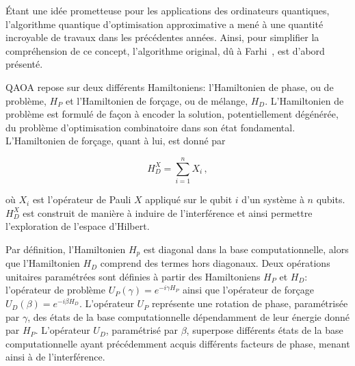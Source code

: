 Étant une idée prometteuse pour les applications des ordinateurs quantiques, l'algorithme quantique d'optimisation approximative a mené à une quantité incroyable de travaux dans les précédentes années. Ainsi, pour simplifier la compréhension de ce concept, l'algorithme original, dû à Farhi~\cite{farhiQuantumApproximateOptimization2014}, est d'abord présenté.

QAOA repose sur deux différents Hamiltoniens: l'Hamiltonien de phase, ou de problème, $H_{P}$ et l'Hamiltonien de forçage, ou de mélange, $H_{D}$. L'Hamiltonien de problème est formulé de façon à encoder la solution, potentiellement dégénérée, du problème d'optimisation combinatoire dans son état fondamental. L'Hamiltonien de forçage, quant à lui, est donné par

\begin{equation}
    \label{eq:x-drive}
    H_{D}^{X} = \sum_{i=1}^{n} X_{i} \,,
\end{equation}

où $X_{i}$ est l'opérateur de Pauli $X$ appliqué sur le qubit $i$ d'un système à $n$ qubits. $H_{D}^{X}$ est construit de manière à induire de l'interférence et ainsi permettre l'exploration de l'espace d'Hilbert. 

Par définition, l'Hamiltonien $H_{p}$ est diagonal dans la base computationnelle, alors que l'Hamiltonien $H_{D}$ comprend des termes hors diagonaux. Deux opérations unitaires paramétrées sont définies à partir des Hamiltoniens $H_{P}$ et $H_{D}$: l'opérateur de problème $U_{P}(\gamma) = e^{-i \gamma H_{P}}$ ainsi que l'opérateur de forçage $U_{D}(\beta) = e^{-i \beta H_{D}}$. L'opérateur $U_{P}$ représente une rotation de phase, paramétrisée par $\gamma$, des états de la base computationnelle dépendamment de leur énergie donné par $H_{P}$. L'opérateur $U_{D}$, paramétrisé par $\beta$, superpose différents états de la base computationnelle ayant précédemment acquis différents facteurs de phase, menant ainsi à de l'interférence.

